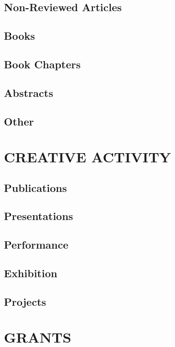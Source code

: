 \documentclass[a4paper,9pt]{extarticle}
\begin{document}
    \subsection*{Non-Reviewed Articles}
        \lipsum[1][5-11]
    \subsection*{Books}
        \lipsum[1][5-11]
    \subsection*{Book Chapters}
        \lipsum[1][5-11]
    \subsection*{Abstracts}
        \lipsum[1][5-11]
    \subsection*{Other}
        \lipsum[1][5-11]

\section*{CREATIVE ACTIVITY}
    \subsection*{Publications}
        \lipsum[1][1-5]
    \subsection*{Presentations}
        \lipsum[1][1-5]
    \subsection*{Performance}
        \lipsum[1][1-5]
    \subsection*{Exhibition}
        \lipsum[1][1-5]
    \subsection*{Projects}
        \lipsum[1][1-5]

\section*{GRANTS}
\end{document}
